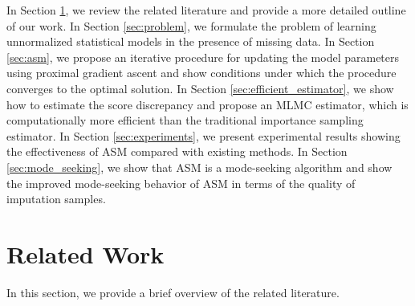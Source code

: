 \documentclass{article} %
\begin{document}
In Section \ref{sec:related}, we review the related literature and provide a more detailed outline of our work. In Section \ref{sec:problem}, we formulate the problem of learning unnormalized statistical models in the presence of missing data. In Section \ref{sec:asm}, we propose an iterative procedure for updating the model parameters using proximal gradient ascent and show conditions under which the procedure converges to the optimal solution. In Section \ref{sec:efficient_estimator}, we show how to estimate the score discrepancy and propose an MLMC estimator, which is computationally more efficient than the traditional importance sampling estimator. In Section \ref{sec:experiments}, we present experimental results showing the effectiveness of ASM compared with existing methods. In Section \ref{sec:mode_seeking}, we show that ASM is a mode-seeking algorithm and show the improved mode-seeking behavior of ASM in terms of the quality of imputation samples.


\section{Related Work}
\label{sec:related}

In this section, we provide a brief overview of the related literature.
\end{document}
